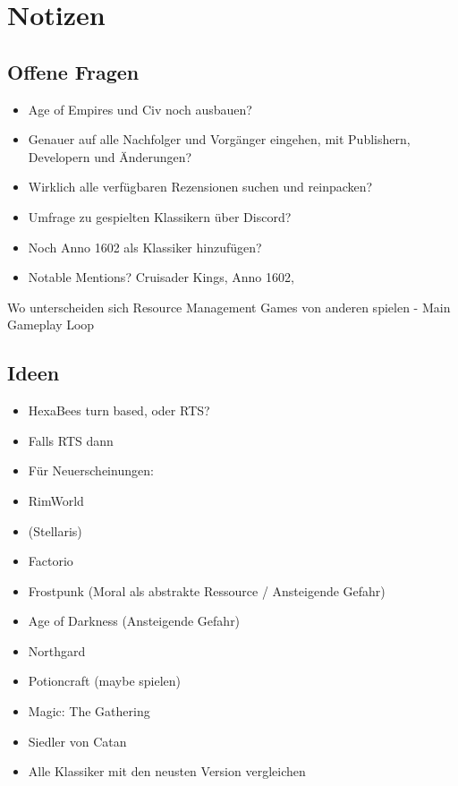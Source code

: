 \section*{Notizen}
\subsection*{Offene Fragen}
\begin{itemize}
    \item Age of Empires und Civ noch ausbauen?
    \item Genauer auf alle Nachfolger und Vorgänger eingehen, mit Publishern, Developern und Änderungen?
    \item Wirklich alle verfügbaren Rezensionen suchen und reinpacken?
    \item Umfrage zu gespielten Klassikern über Discord?
    \item Noch Anno 1602 als Klassiker hinzufügen?
    \item Notable Mentions? Cruisader Kings, Anno 1602, 
\end{itemize}

Wo unterscheiden sich Resource Management Games von anderen spielen
- Main Gameplay Loop 

\subsection*{Ideen}
\begin{itemize}
    \item HexaBees turn based, oder RTS?
    \item Falls RTS dann 
    \item Für Neuerscheinungen:
    \item RimWorld
    \item (Stellaris)
    \item Factorio
    \item Frostpunk (Moral als abstrakte Ressource / Ansteigende Gefahr)
    \item Age of Darkness (Ansteigende Gefahr)
    \item Northgard
    \item Potioncraft (maybe spielen)
    \item Magic: The Gathering
    \item Siedler von Catan
    \item Alle Klassiker mit den neusten Version vergleichen
\end{itemize}

